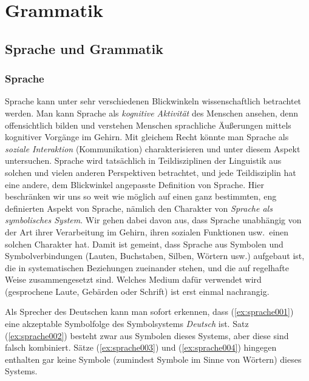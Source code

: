 \chapter{Grammatik}
\label{sec:grammatik}

\section{Sprache und Grammatik}
\label{sec:spracheundgrammatik}

\subsection{Sprache}
\label{sec:sprache}


Sprache kann unter sehr verschiedenen Blickwinkeln wissenschaftlich betrachtet werden.
Man kann Sprache als \textit{kognitive Aktivität} des Menschen ansehen, denn offensichtlich bilden und verstehen Menschen sprachliche Äußerungen mittels kognitiver Vorgänge im Gehirn.
Mit gleichem Recht könnte man Sprache als \textit{soziale Interaktion} (Kommunikation) charakterisieren und unter diesem Aspekt untersuchen.
Sprache wird tatsächlich in Teildisziplinen der Linguistik aus solchen und vielen anderen Perspektiven betrachtet, und jede Teildisziplin hat eine andere, dem Blickwinkel angepasste Definition von Sprache.
Hier beschränken wir uns so weit wie möglich auf einen ganz bestimmten, eng definierten Aspekt von Sprache, nämlich den Charakter von \textit{Sprache als symbolisches System}.
Wir gehen dabei davon aus, dass Sprache unabhängig von der Art ihrer Verarbeitung im Gehirn, ihren sozialen Funktionen usw.\ einen solchen Charakter hat.
Damit ist gemeint, dass Sprache aus Symbolen und Symbolverbindungen (Lauten, Buchstaben, Silben, Wörtern usw.) aufgebaut ist, die in systematischen Beziehungen zueinander stehen, und die auf regelhafte Weise zusammengesetzt sind.
Welches Medium dafür verwendet wird (\zB gesprochene Laute, Gebärden oder Schrift) ist erst einmal nachrangig.

Als Sprecher des Deutschen kann man \zB sofort erkennen, dass (\ref{ex:sprache001}) eine akzeptable Symbolfolge des Symbolsystems \textit{Deutsch} ist.
Satz (\ref{ex:sprache002}) besteht zwar aus Symbolen dieses Systems, aber diese sind falsch kombiniert.
Sätze (\ref{ex:sprache003}) und (\ref{ex:sprache004}) hingegen enthalten gar keine Symbole (zumindest Symbole im Sinne von Wörtern) dieses Systems.

